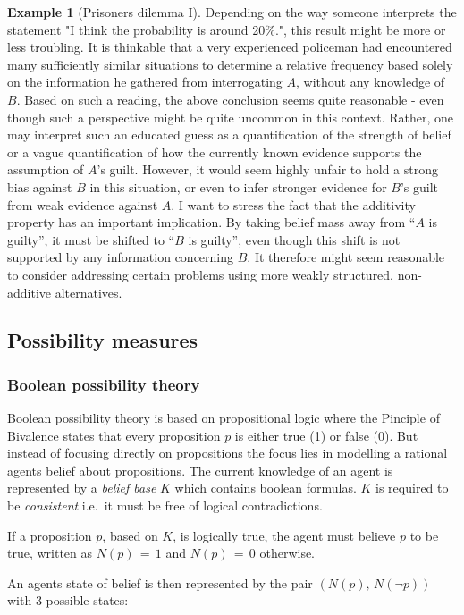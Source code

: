 \documentclass[
]{report}
\theoremstyle{definition}
\theoremstyle{definition}
\newtheorem{example}{Example}[section]
\begin{document}
\begin{example}[Prisoners dilemma I]
Depending on the way someone interprets the statement "I think the probability is around 20\%.", this result might be more or less troubling. It is thinkable that a very experienced policeman had encountered many sufficiently similar situations to determine a relative frequency based solely on the information he gathered from interrogating $A$, without any knowledge of $B$. Based on such a reading, the above conclusion seems quite reasonable - even though such a perspective might be quite uncommon in this context. Rather, one may interpret such an educated guess as a quantification of the strength of belief or a vague quantification of how the currently known evidence supports the assumption of $A$'s guilt. However, it would seem highly unfair to hold a strong bias against $B$ in this situation, or even to infer stronger evidence for $B$’s guilt from weak evidence against $A$. I want to stress the fact that the additivity property has an important implication. By taking belief mass away from “$A$ is guilty”, it must be shifted to “$B$ is guilty”, even though this shift is not supported by any information concerning $B$. It therefore might seem reasonable to consider addressing certain problems using more weakly structured, non-additive alternatives.
\end{example}

\subsection{Possibility measures}

\subsubsection{Boolean possibility theory}

Boolean possibility theory is based on propositional logic where the
Pinciple of Bivalence states that every proposition \(p\) is either true
(1) or false (0). But instead of focusing directly on propositions the
focus lies in modelling a rational agents belief about propositions. The
current knowledge of an agent is represented by a \textit{belief base}
\(K\) which contains boolean formulas. \(K\) is required to be
\textit{consistent} i.e.~it must be free of logical contradictions.

If a proposition \(p\), based on \(K\), is logically true, the agent
must believe \(p\) to be true, written as \(N(p) \, = \, 1\) and
\(N(p) \, = \, 0\) otherwise.

An agents state of belief is then represented by the pair
\((N(p), \, N(\lnot p))\) with 3 possible states:
\end{document}
